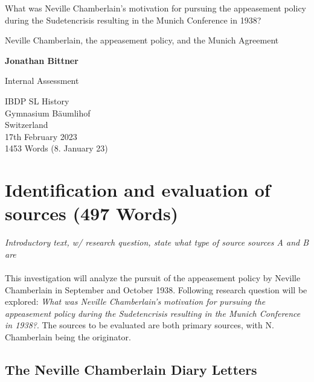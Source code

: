\documentclass[10pt, a4papert, hidelinks]{article}
\begin{document}
\begin{titlepage}
	\begin{center}
		\vspace*{1cm}
 
		What was Neville Chamberlain's motivation for pursuing the appeasement policy during the Sudetencrisis resulting in the Munich Conference in 1938?
 
		\vspace{0.5cm}
		Neville Chamberlain, the appeasement policy, and the Munich Agreement
			 
		\vspace{1.5cm}
 
		\textbf{Jonathan Bittner}
 
		\vfill
			 
		Internal Assessment
			 
		\vspace{0.8cm}
	  
			 
		IBDP SL History\\
		Gymnasium Bäumlihof\\
		Switzerland\\
		17th February 2023\\
		1453 Words (8. January 23)
			 
	\end{center}
 \end{titlepage}

\tableofcontents
\newpage

\section{Identification and evaluation of sources (497 Words)} %


\emph{Introductory text, w/ research question, state what type of source sources A and B are}\\\\
This investigation will analyze the pursuit of the appeasement policy by Neville Chamberlain in September and October 1938. Following research question will be explored: \emph{What was Neville Chamberlain's motivation for pursuing the appeasement policy during the Sudetencrisis resulting in the Munich Conference in 1938?}. The sources to be evaluated are both primary sources, with N. Chamberlain being the originator.

\subsection{The Neville Chamberlain Diary Letters} %
\end{document}
